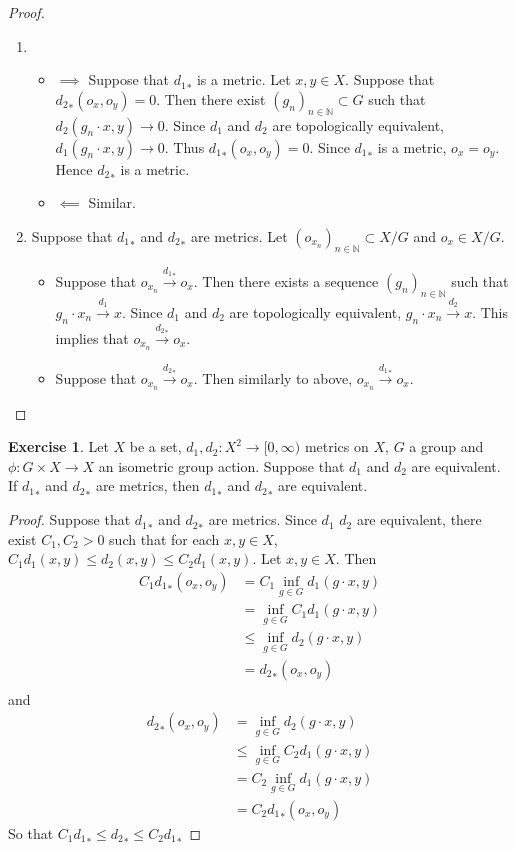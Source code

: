 \documentclass[12pt]{amsart}
\theoremstyle{definition}
\newtheorem{ex}[definition]{Exercise}
\newcommand{\N}{\mathbb{N}}
\newcommand{\Rg}{[0,\infty)}
\newcommand{\conv}[1]{\xrightarrow{#1}}
\newcommand{\lex}[1]{\label{ex:#1}}
\begin{document}
	\begin{proof}\
	\begin{enumerate}
	\item 
	\begin{itemize}
	\item $\implies$ Suppose that ${d_1}_*$ is a metric. Let $x,y \in X$. Suppose that ${d_2}_*(o_x, o_y) = 0$. Then there exist $(g_n)_{n \in \N} \subset G$ such that $d_2(g_n \cdot x, y) \rightarrow 0$. Since $d_1$ and $d_2$ are topologically equivalent, $d_1(g_n \cdot x, y) \rightarrow 0$. Thus ${d_1}_*(o_x, o_y) = 0$. Since ${d_1}_*$ is a metric, $o_x = o_y$. Hence ${d_2}_*$ is a metric. 
	\item $\impliedby$ Similar.
	\end{itemize}
	\item Suppose that ${d_1}_*$ and ${d_2}_*$ are metrics. Let $(o_{x_n})_{n \in \N} \subset X/G$ and $o_x \in X/G$. 
	\begin{itemize}
	\item Suppose that $o_{x_n} \conv{{d_1}_*} o_x$. Then there exists a sequence $(g_n)_{n \in \N}$ such that $g_n \cdot x_n \conv{d_1} x$. Since $d_1$ and $d_2$ are topologically equivalent, $g_n \cdot x_n \conv{d_2} x$. This implies that $o_{x_n} \conv{{d_2}_*} o_x$. 
	\item Suppose that $o_{x_n} \conv{{d_2}_*} o_x$. Then similarly to above, $o_{x_n} \conv{{d_1}_*} o_x$.
	\end{itemize}
	\end{enumerate}
	\end{proof}	
	
	\begin{ex} \lex{}
	Let $X$ be a set, $d_1, d_2: X^2 \rightarrow \Rg$ metrics on $X$, $G$ a group and $\phi: G \times X \rightarrow X$ an isometric group action. Suppose that $d_1$ and $d_2$ are equivalent. If ${d_1}_*$ and ${d_2}_*$ are metrics, then ${d_1}_*$ and ${d_2}_*$ are equivalent.
	\end{ex}
	
	\begin{proof} Suppose that ${d_1}_*$ and ${d_2}_*$  are metrics. Since $d_1$ $d_2$ are equivalent, there exist $C_1, C_2 >0$ such that for each $x,y \in X$, $C_1d_1(x,y) \leq d_2(x,y) \leq C_2d_1(x,y)$. Let $x,y \in X$. Then
	\begin{align*}
	C_1{d_1}_*(o_x, o_y) 
	&= C_1 \inf_{g \in G} d_1(g \cdot x, y) \\
	&=  \inf_{g \in G} C_1 d_1(g \cdot x, y) \\
	&\leq \inf_{g \in G} d_2(g \cdot x, y) \\
	&= {d_2}_*(o_x, o_y) \\
	\end{align*}	 
	and 
	\begin{align*}
	{d_2}_*(o_x, o_y) 
	&= \inf_{g \in G} d_2(g \cdot x, y) \\	
	& \leq \inf_{g \in G} C_2 d_1(g \cdot x, y) \\
	&= C_2 \inf_{g \in G}  d_1(g \cdot x, y) \\
	&= C_2 {d_1}_*(o_x, o_y)
	\end{align*}
	So that $C_1 {d_1}_* \leq {d_2}_* \leq C_2 {d_1}_*$
	\end{proof}
\end{document}
